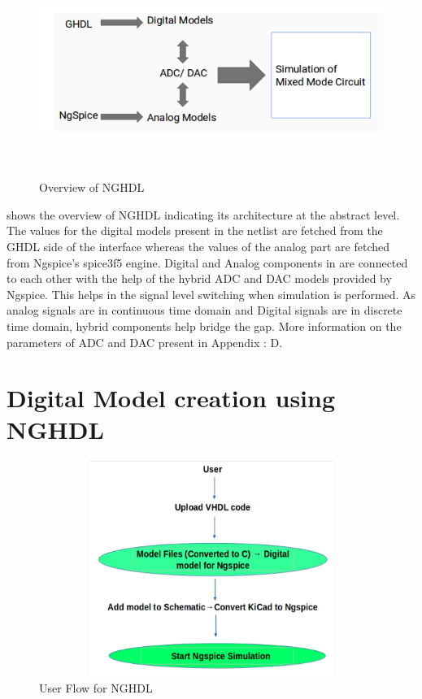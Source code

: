 \begin{figure}[!htp]
\centering
\includegraphics[width = 13cm, height = 7cm]{./NGHDL/NGHDL_Overview.png}
\caption{Overview of NGHDL}
\label{overview}
\end{figure}
 shows the overview of NGHDL indicating its architecture at the abstract level. The values for the digital models present in the netlist are fetched from the GHDL side of the interface whereas the values of the analog part are fetched from Ngspice's spice3f5 engine. Digital and Analog components in  are connected to each other with the help of the hybrid ADC and DAC models provided by Ngspice. This helps in the signal level switching when simulation is performed. As analog signals are in continuous time domain and Digital signals are in discrete time domain, hybrid components help bridge the gap. More information on the parameters of ADC and DAC present in Appendix : D.

\pagebreak

\section{Digital Model creation using NGHDL}


\begin{figure}[!htp]
\centering
\includegraphics[width = 13cm, height = 7cm]{./NGHDL/NGHDL_Flow.png}
\caption{User Flow for NGHDL}
\label{user_flow}
\end{figure}

